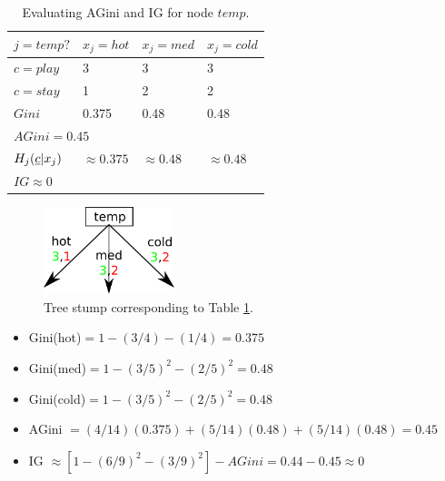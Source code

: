 \begin{table}[h!]
\centering
\begin{tabular}{|l|l|l|l|}
\hline
$j=temp?$ & \cellcolor[HTML]{CBCEFB}$x_j=hot$ & \cellcolor[HTML]{CBCEFB}$x_j=med$ & \cellcolor[HTML]{CBCEFB}$x_j=cold$ \\ \hline
\rowcolor[HTML]{FFFFC7} 
\cellcolor[HTML]{9AFF99}$c=play$ & 3 & 3 & 3 \\ \hline
\rowcolor[HTML]{FFFFC7} 
\cellcolor[HTML]{FFCCC9}$c=stay$ & 1 & 2 & 2 \\ \hline
$Gini$ & 0.375 & 0.48 & 0.48 \\ \hline
\multicolumn{4}{|l|}{$AGini=0.45$} \\ \hline
$H_j(\rvc|x_j)$ & $\approx 0.375$ & $\approx 0.48$ & $\approx 0.48$ \\ \hline
\multicolumn{4}{|l|}{$IG\approx 0$} \\ \hline
\end{tabular}
\caption{Evaluating AGini and IG for node $temp$.}
\label{tab-temp-gini}
\end{table}



\begin{figure}[h!]
\centering
\includegraphics[width=1.5in]
{dtree/stump-3children.png}
\caption{Tree stump
corresponding to Table \ref{tab-temp-gini}.}
\label{fig-stump-3cildren}
\end{figure}



\begin{itemize}
\item Gini(hot)$=1-(3/4)-(1/4)=0.375$
\item Gini(med)$=1-(3/5)^2-(2/5)^2=0.48$
\item Gini(cold)$=1-(3/5)^2-(2/5)^2=0.48$
\item AGini $ = (4/14)(0.375)+
(5/14)(0.48) + (5/14)(0.48) = 0.45 $
\item IG $\approx [1 -(6/9)^2-(3/9)^2]-AGini= 
0.44-0.45\approx 0$
\end{itemize}

